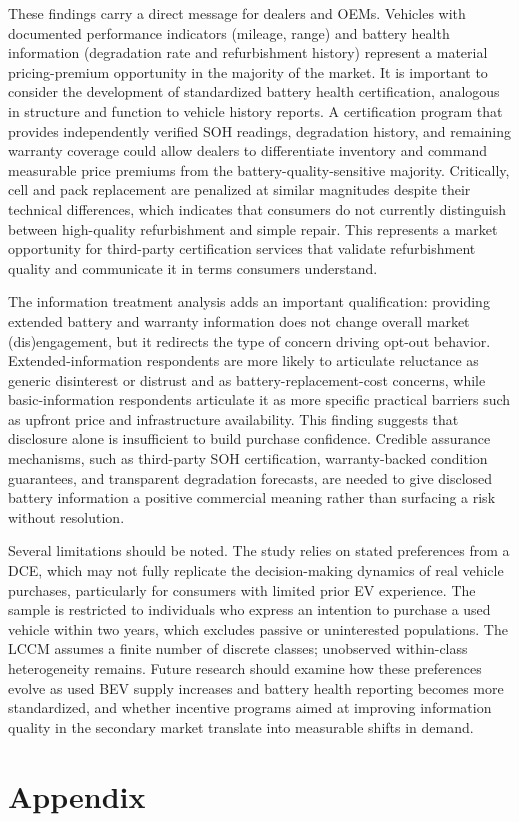 \documentclass[a4paper,fleqn]{cas-sc}   %
\begin{document}
These findings carry a direct message for dealers and OEMs. Vehicles with documented performance indicators (mileage, range) and battery health information (degradation rate and refurbishment history) represent a material pricing-premium opportunity in the majority of the market. It is important to consider the development of standardized battery health certification, analogous in structure and function to vehicle history reports. A certification program that provides independently verified SOH readings, degradation history, and remaining warranty coverage could allow dealers to differentiate inventory and command measurable price premiums from the battery-quality-sensitive majority. Critically, cell and pack replacement are penalized at similar magnitudes despite their technical differences, which indicates that consumers do not currently distinguish between high-quality refurbishment and simple repair. This represents a market opportunity for third-party certification services that validate refurbishment quality and communicate it in terms consumers understand.

The information treatment analysis adds an important qualification: providing extended battery and warranty information does not change overall market (dis)engagement, but it redirects the type of concern driving opt-out behavior. Extended-information respondents are more likely to articulate reluctance as generic disinterest or distrust and as battery-replacement-cost concerns, while basic-information respondents articulate it as more specific practical barriers such as upfront price and infrastructure availability. This finding suggests that disclosure alone is insufficient to build purchase confidence. Credible assurance mechanisms, such as third-party SOH certification, warranty-backed condition guarantees, and transparent degradation forecasts, are needed to give disclosed battery information a positive commercial meaning rather than surfacing a risk without resolution.

Several limitations should be noted. The study relies on stated preferences from a DCE, which may not fully replicate the decision-making dynamics of real vehicle purchases, particularly for consumers with limited prior EV experience. The sample is restricted to individuals who express an intention to purchase a used vehicle within two years, which excludes passive or uninterested populations. The LCCM assumes a finite number of discrete classes; unobserved within-class heterogeneity remains. Future research should examine how these preferences evolve as used BEV supply increases and battery health reporting becomes more standardized, and whether incentive programs aimed at improving information quality in the secondary market translate into measurable shifts in demand.

\section{Appendix}
\label{section:appendix}


\printcredits


\printbibliography
\end{document}
